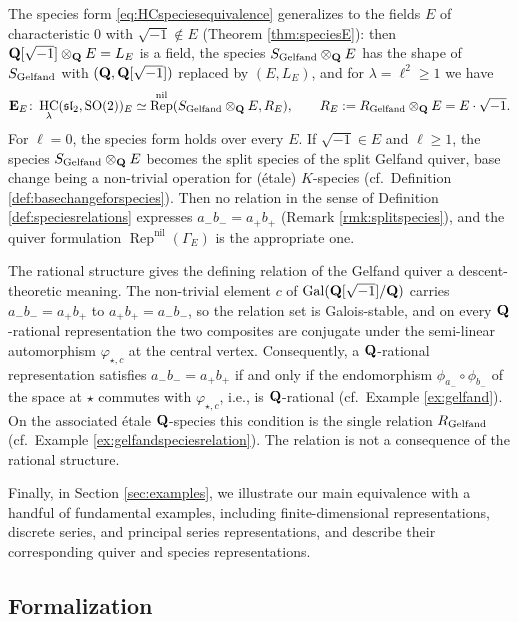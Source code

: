 \documentclass[a4paper,12pt,reqno]{amsart}
\newcommand{\QQ}{{\rm\bf Q}}
\newcommand{\EE}{{\rm\bf E}}
\DeclareMathOperator{\SO}{\mathrm{SO}}
\DeclareMathOperator{\Gal}{\mathrm {Gal}}
\DeclareMathOperator{\HC}{\mathrm{HC}}
\DeclareMathOperator{\Rep}{\mathrm{Rep}}
\newcommand{\liesl}{{\mathfrak {sl}}}
\theoremstyle{plain}
\theoremstyle{remark}
\begin{document}
    The species form \eqref{eq:HCspeciesequivalence} generalizes to the fields $E$ of characteristic $0$ with $\sqrt{-1}\not\in E$ (Theorem \ref{thm:speciesE}): then $\QQ[\sqrt{-1}]\otimes_\QQ E=L_E$ is a field, the species $S_{\rm Gelfand}\otimes_\QQ E$ has the shape of $S_{\rm Gelfand}$ with $(\QQ,\QQ[\sqrt{-1}])$ replaced by $(E,L_E)$, and for $\lambda=\ell^2\geq1$ we have
    \[
      \EE_E\colon\HC_\lambda(\liesl_2,\SO(2))_E \simeq \Rep^{\mathrm{nil}}(S_{\rm Gelfand}\otimes_\QQ E,R_E),
      \qquad
      R_E:=R_{\rm Gelfand}\otimes_\QQ E=E\cdot\sqrt{-1}.
    \]
    For $\ell=0$, the species form holds over every $E$. If $\sqrt{-1}\in E$ and $\ell\geq1$, the species $S_{\rm Gelfand}\otimes_\QQ E$ becomes the split species of the split Gelfand quiver, base change being a non-trivial operation for (\'etale) $K$-species (cf.\ Definition \ref{def:basechangeforspecies}). Then no relation in the sense of Definition \ref{def:speciesrelations} expresses $a_{-} b_{-} = a_{+} b_{+}$ (Remark \ref{rmk:splitspecies}), and the quiver formulation $\Rep^{\mathrm{nil}}(\Gamma_E)$ is the appropriate one.

    The rational structure gives the defining relation of the Gelfand quiver a descent-theoretic meaning. The non-trivial element $c$ of $\Gal(\QQ[\sqrt{-1}]/\QQ)$ carries $a_{-} b_{-} = a_{+} b_{+}$ to $a_{+} b_{+} = a_{-} b_{-}$, so the relation set is Galois-stable, and on every $\QQ$-rational representation the two composites are conjugate under the semi-linear automorphism $\varphi_{\star,c}$ at the central vertex. Consequently, a $\QQ$-rational representation satisfies $a_{-} b_{-} = a_{+} b_{+}$ if and only if the endomorphism $\phi_{a_-}\circ\phi_{b_-}$ of the space at $\star$ commutes with $\varphi_{\star,c}$, i.e., is $\QQ$-rational (cf.\ Example \ref{ex:gelfand}). On the associated \'etale $\QQ$-species this condition is the single relation $R_{\rm Gelfand}$ (cf.\ Example \ref{ex:gelfandspeciesrelation}). The relation is not a consequence of the rational structure.
    
    Finally, in Section \ref{sec:examples}, we illustrate our main equivalence with a handful of fundamental examples, including finite-dimensional representations, discrete series, and principal series representations, and describe their corresponding quiver and species representations.

\subsection*{Formalization}
\end{document}
